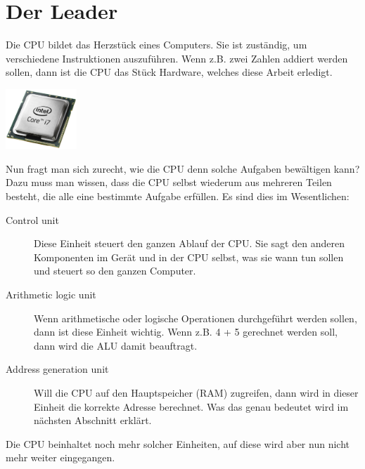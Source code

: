 \newpage
\section{Der Leader}
Die \gls{CPU} bildet das Herzstück eines Computers. Sie ist zuständig, um verschiedene Instruktionen auszuführen. Wenn
z.B. zwei Zahlen addiert werden sollen, dann ist die CPU das Stück Hardware, welches diese Arbeit erledigt.\par
\begin{minipage}{\linewidth}
    \centering
    \includegraphics[width=0.2\textwidth]{../common/chapter_02/resources/01_cpu_intel.png}
\end{minipage}
Nun fragt man sich zurecht, wie die CPU denn solche Aufgaben bewältigen kann? Dazu muss man wissen, dass die CPU
selbst wiederum aus mehreren Teilen besteht, die alle eine bestimmte Aufgabe erfüllen. Es sind dies im Wesentlichen:
\begin{description}
    \item[Control unit] Diese Einheit steuert den ganzen Ablauf der CPU. Sie sagt den anderen Komponenten im Gerät und
    in der CPU selbst, was sie wann tun sollen und steuert so den ganzen Computer.\cite{wikipedia:cu}
    \item[Arithmetic logic unit] Wenn arithmetische oder logische Operationen durchgeführt werden sollen, dann ist diese
    Einheit wichtig. Wenn z.B. 4 + 5 gerechnet werden soll, dann wird die ALU damit beauftragt.\cite{wikipedia:alu}
    \item[Address generation unit] Will die CPU auf den Hauptspeicher (RAM) zugreifen, dann wird in dieser Einheit die korrekte
    Adresse berechnet. Was das genau bedeutet wird im nächsten Abschnitt erklärt.\cite{wikipedia:agu}
\end{description}
Die CPU beinhaltet noch mehr solcher Einheiten, auf diese wird aber nun nicht mehr weiter eingegangen.
